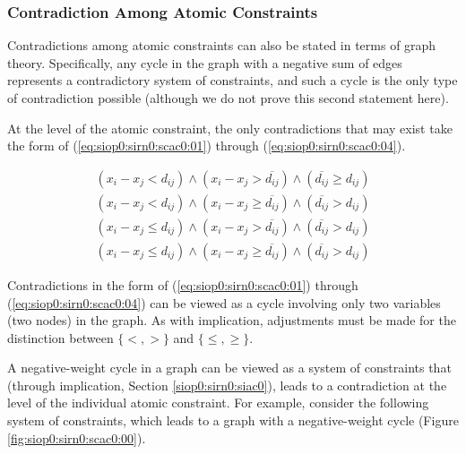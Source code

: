 \subsubsection{Contradiction Among Atomic Constraints}
\label{siop0:sirn0:scac0}

Contradictions among atomic constraints can also be stated in terms
of graph theory.  Specifically, any cycle 
in the graph with a negative sum of
edges represents a contradictory system of constraints,
and such a cycle is the only type of contradiction possible (although
we do not prove this second statement here).

At the level of the atomic constraint, the only contradictions
that may exist take the form of
(\ref{eq:siop0:sirn0:scac0:01})
through
(\ref{eq:siop0:sirn0:scac0:04}).

\begin{eqnarray}
\label{eq:siop0:sirn0:scac0:01} 
   & (x_i - x_j   <  d_{ij}) \wedge (x_i - x_j   >  \overline{d_{ij}}) \wedge (\overline{d_{ij}} \geq d_{ij}) & \\
\label{eq:siop0:sirn0:scac0:02}
   & (x_i - x_j   <  d_{ij}) \wedge (x_i - x_j \geq \overline{d_{ij}}) \wedge (\overline{d_{ij}}   >  d_{ij}) & \\
\label{eq:siop0:sirn0:scac0:03}
   & (x_i - x_j \leq d_{ij}) \wedge (x_i - x_j   >  \overline{d_{ij}}) \wedge (\overline{d_{ij}}   >  d_{ij}) & \\
\label{eq:siop0:sirn0:scac0:04}
   & (x_i - x_j \leq d_{ij}) \wedge (x_i - x_j \geq \overline{d_{ij}}) \wedge (\overline{d_{ij}}   >  d_{ij}) &
\end{eqnarray}

Contradictions in the form of
(\ref{eq:siop0:sirn0:scac0:01})
through
(\ref{eq:siop0:sirn0:scac0:04}) can be viewed as a cycle involving
only two variables (two nodes) in the graph.  As with implication, 
adjustments must be made for the distinction between
$\{ <, > \}$ and $\{ \leq , \geq \}$.

A negative-weight cycle in a graph can be viewed as a system of
constraints that (through implication, Section 
\ref{siop0:sirn0:siac0}), leads to a contradiction at the level
of the individual atomic constraint.  For example, consider
the following system of constraints, which leads to a graph with
a negative-weight cycle (Figure \ref{fig:siop0:sirn0:scac0:00}).

